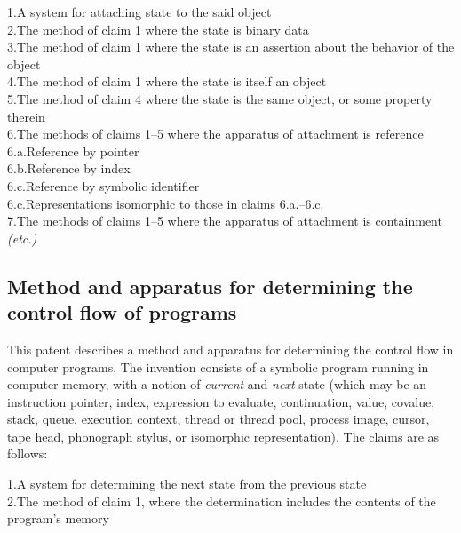 \documentclass[acmtocl]%
{boviktrans}
\begin{document}
1.\quad A system for attaching state to the said object \\

2.\quad The method of claim 1 where the state is binary data \\

3.\quad The method of claim 1 where the state is an assertion about the behavior of the object \\

4.\quad The method of claim 1 where the state is itself an object \\

5.\quad The method of claim 4 where the state is the same object, or some property therein \\

6.\quad The methods of claims 1--5 where the apparatus of attachment is reference \\
\qquad 6.a.\quad Reference by pointer \\
\qquad 6.b.\quad Reference by index \\
\qquad 6.c.\quad Reference by symbolic identifier \\
\qquad 6.c.\quad Representations isomorphic to those in claims 6.a.--6.c. \\

7.\quad The methods of claims 1--5 where the apparatus of attachment is containment \\

{\it (etc.)}

\subsection{Method and apparatus for determining the control flow of programs}

This patent describes a method and apparatus for determining the
control flow in computer programs. The invention consists of a
symbolic program running in computer memory, with a notion of {\it
  current} and {\it next} state (which may be an instruction pointer,
index, expression to evaluate, continuation, value, covalue, stack,
queue, execution context, thread or thread pool, process image,
cursor, tape head, phonograph stylus, or isomorphic
representation). The claims are as follows:

1.\quad A system for determining the next state from the previous state \\

2.\quad The method of claim 1, where the determination includes the contents of the program's memory \\
\end{document}

